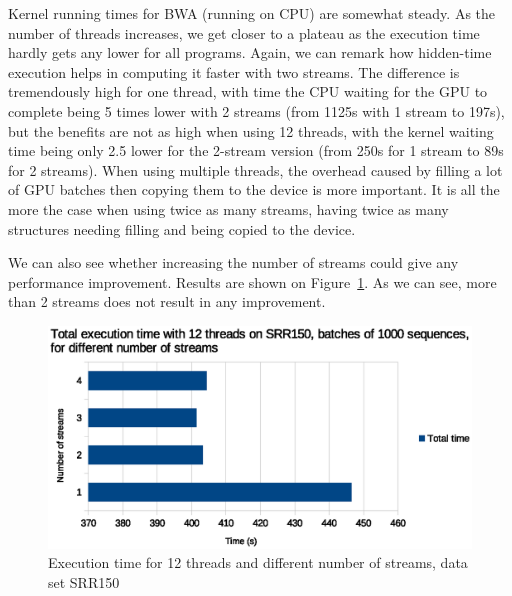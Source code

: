 Kernel running times for BWA (running on CPU) are somewhat steady. As the number of threads increases, we get closer to a plateau as the execution time hardly gets any lower for all programs. Again, we can remark how hidden-time execution helps in computing it faster with two streams. The difference is tremendously high for one thread, with time the CPU waiting for the GPU to complete being 5 times lower with 2 streams (from 1125s with 1 stream to 197s), but the benefits are not as high when using 12 threads, with the kernel waiting time being only 2.5 lower for the 2-stream version (from 250s for 1 stream to 89s for 2 streams). When using multiple threads, the overhead caused by filling a lot of GPU batches then copying them to the device is more important. It is all the more the case when using twice as many streams, having twice as many structures needing filling and being copied to the device.

We can also see whether increasing the number of streams could give any performance improvement. Results are shown on Figure~\ref{fig:exec-time-nbstreams}. As we can see, more than 2 streams does not result in any improvement. 

\begin{figure}[h]
	\centering
	\includegraphics[width=0.9\linewidth]{exec-time-nbstreams}
	\caption{Execution time for 12 threads and different number of streams, data set SRR150}
	\label{fig:exec-time-nbstreams}
\end{figure}

